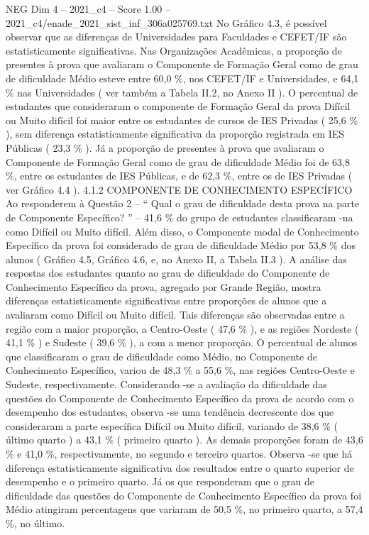 \begin{textsample}{NEG Dim 4 – 2021\_c4 – Score 1.00 – 2021\_c4/enade\_2021\_sist\_inf\_306a025769.txt}
No Gráfico 4.3, é possível observar que as diferenças de Universidades para Faculdades e CEFET/IF são estatisticamente significativas.
Nas Organizações Acadêmicas, a proporção de presentes à prova que avaliaram o Componente de Formação Geral como de grau de dificuldade Médio esteve entre 60,0 \%, nos CEFET/IF e Universidades, e 64,1 \% nas Universidades ( ver também a Tabela II.2, no Anexo II ).
O percentual de estudantes que consideraram o componente de Formação Geral da prova Difícil ou Muito difícil foi maior entre os estudantes de cursos de IES Privadas ( 25,6 \% ), sem diferença estatisticamente significativa da proporção registrada em IES Públicas ( 23,3 \% ).
Já a proporção de presentes à prova que avaliaram o Componente de Formação Geral como de grau de dificuldade Médio foi de 63,8 \%, entre os estudantes de IES Públicas, e de 62,3 \%, entre os de IES Privadas ( ver Gráfico 4.4 ). 4.1.2 COMPONENTE DE CONHECIMENTO ESPECÍFICO Ao responderem à Questão 2 – “ Qual o grau de dificuldade desta prova na parte de Componente Específico? ” – 41,6 \% do grupo de estudantes classificaram -na como Difícil ou Muito difícil.
Além disso, o Componente modal de Conhecimento Específico da prova foi considerado de grau de dificuldade Médio por 53,8 \% dos alunos ( Gráfico 4.5, Gráfico 4.6, e, no Anexo II, a Tabela II.3 ).
A análise das respostas dos estudantes quanto ao grau de dificuldade do Componente de Conhecimento Específico da prova, agregado por Grande Região, mostra diferenças estatisticamente significativas entre proporções de alunos que a avaliaram como Difícil ou Muito difícil.
Tais diferenças são observadas entre a região com a maior proporção, a Centro-Oeste ( 47,6 \% ), e as regiões Nordeste ( 41,1 \% ) e Sudeste ( 39,6 \% ), a com a menor proporção.
O percentual de alunos que classificaram o grau de dificuldade como Médio, no Componente de Conhecimento Específico, variou de 48,3 \% a 55,6 \%, nas regiões Centro-Oeste e Sudeste, respectivamente.
Considerando -se a avaliação da dificuldade das questões do Componente de Conhecimento Específico da prova de acordo com o desempenho dos estudantes, observa -se uma tendência decrescente dos que consideraram a parte específica Difícil ou Muito difícil, variando de 38,6 \% ( último quarto ) a 43,1 \% ( primeiro quarto ).
As demais proporções foram de 43,6 \% e 41,0 \%, respectivamente, no segundo e terceiro quartos.
Observa -se que há diferença estatisticamente significativa dos resultados entre o quarto superior de desempenho e o primeiro quarto.
Já os que responderam que o grau de dificuldade das questões do Componente de Conhecimento Específico da prova foi Médio atingiram percentagens que variaram de 50,5 \%, no primeiro quarto, a 57,4 \%, no último.

\end{textsample}
